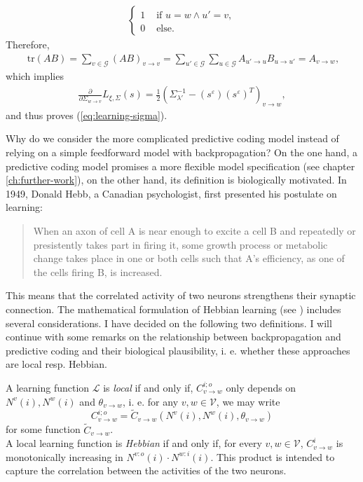 \documentclass[a4paper,11pt]{report}
\newcommand{\tr}{\;\text{tr}}
\begin{document}
\begin{Bew}
\begin{align*}
\begin{cases}
1&\text{ if }u=w\wedge u'=v,\\
0&\text{ else}.
\end{cases}
\end{align*}
Therefore,
\begin{align*}
\tr(AB)=\sum_{v\in\mathcal{G}}(AB)_{v\to v}=
\sum_{u'\in\mathcal{G}}\sum_{u\in\mathcal{G}}A_{u'\to u}B_{u\to u'}=
A_{v\to w},
\end{align*}
which implies
\begin{align*}
\frac{\partial}{\partial\Sigma_{w\to v}}L_{\xi,\Sigma}(s)=\frac12\left(\Sigma_{\lambda'}^{-1}-\left(s^{\varepsilon}\right)\left(s^{\varepsilon}\right)^T\right)_{v\to w},
\end{align*}
and thus proves (\ref{eq:learning-sigma}).
\end{Bew}

\begin{Par}
Why do we consider the more complicated predictive coding model instead of relying on a simple feedforward model with backpropagation? On the one hand, a predictive coding model promises a more flexible model specification (see chapter \ref{ch:further-work}), on the other hand, its definition is biologically motivated. In 1949, Donald Hebb, a Canadian psychologist, first presented his postulate on learning:
\begin{quote}
When an axon of cell A is near enough to excite a cell B and repeatedly or presistently takes part in firing it, some growth process or metabolic change takes place in one or both cells such that A's efficiency, as one of the cells firing B, is increased. \cite[][62]{Hebb1949}
\end{quote}
This means that the correlated activity of two neurons strengthens their synaptic connection. The mathematical formulation of Hebbian learning (see \cite{Gerstner2002}) includes several considerations. I have decided on the following two definitions. I will continue with some remarks on the relationship between backpropagation and predictive coding and their biological plausibility, i. e. whether these approaches are local resp. Hebbian.
\end{Par}

\begin{Def}
A learning function $\mathcal{L}$ is \emph{local} if and only if, $C^{i;o}_{v\to w}$ only depends on $N^v(i),N^w(i)$ and $\theta_{v\to w}$, i. e. for any $v,w\in\mathcal{V}$, we may write
\[
C^{i;o}_{v\to w}=\tilde{C}_{v\to w}\left(N^v(i),N^w(i),\theta_{v\to w}\right)
\]
for some function $\tilde{C}_{v\to w}$.\\
A local learning function is \emph{Hebbian} if and only if, for every $v,w\in\mathcal{V}$, $C^i_{v\to w}$ is monotonically increasing in $N^{v:o}(i)\cdot N^{w:i}(i)$. This product is intended to capture the correlation between the activities of the two neurons.
\end{Def}
\end{document}
